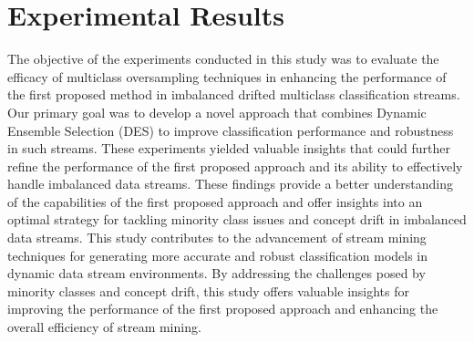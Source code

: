 \section{Experimental Results}
\label{sec:4_5_Expsetup}

The objective of the experiments conducted in this study was to evaluate the efficacy of multiclass oversampling techniques in enhancing the performance of the first proposed method in imbalanced drifted multiclass classification streams. Our primary goal was to develop a novel approach that combines Dynamic Ensemble Selection (DES) to improve classification performance and robustness in such streams. These experiments yielded valuable insights that could further refine the performance of the first proposed approach and its ability to effectively handle imbalanced data streams. These findings provide a better understanding of the capabilities of the first proposed approach and offer insights into an optimal strategy for tackling minority class issues and concept drift in imbalanced data streams. This study contributes to the advancement of stream mining techniques for generating more accurate and robust classification models in dynamic data stream environments. By addressing the challenges posed by minority classes and concept drift, this study offers valuable insights for improving the performance of the first proposed approach and enhancing the overall efficiency of stream mining.

